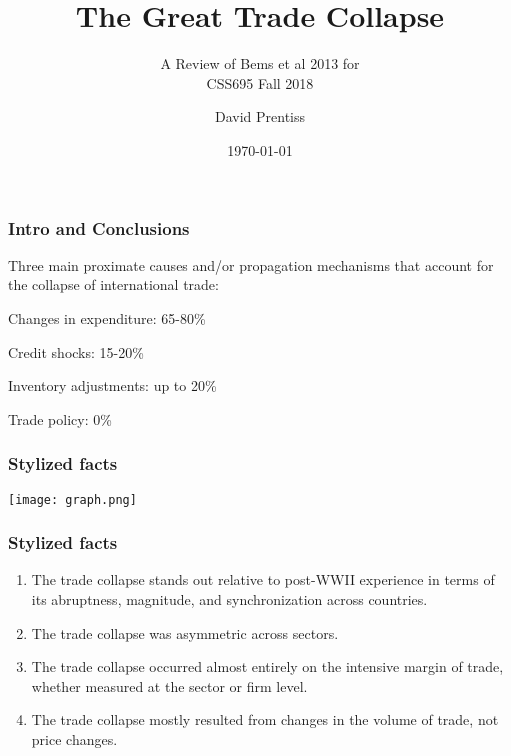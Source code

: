 \documentclass{beamer}
\newcommand{\cmark}{\ding{51}}%
\newcommand{\xmark}{\ding{55}}%
\begin{document}
\title{The Great Trade Collapse}
\subtitle{A Review of Bems et al 2013 for \\
  CSS695 Fall 2018}
\author{David Prentiss}
\date{\today}

\frame{\titlepage}

\begin{frame}
  \frametitle{Intro and Conclusions}
  \begin{itemize*}
  \item Three main proximate causes and/or propagation mechanisms that account for the collapse of international trade:
  \item \textcolor{green}{\cmark} Changes in expenditure: 65-80\%
  \item \textcolor{green}{\cmark} Credit shocks: 15-20\%
  \item \textcolor{green}{\cmark} Inventory adjustments: up to 20\%
  \item \textcolor{red}{\xmark} Trade policy: 0\%
  \end{itemize*}
\end{frame}

\begin{frame}
  \frametitle{Stylized facts}
  \begin{center}
    \texttt{[image: graph.png]}
  \end{center}
\end{frame}

\begin{frame}
  \frametitle{Stylized facts}
  \begin{enumerate}
  \item The trade collapse stands out relative to post-WWII experience in terms of its abruptness, magnitude, and synchronization across countries.
  \item The trade collapse was asymmetric across sectors.
  \item The trade collapse occurred almost entirely on the intensive margin of trade, whether measured at the sector or firm level.
  \item The trade collapse mostly resulted from changes in the volume of trade, not price changes.
  \end{enumerate}
\end{frame}
\end{document}
